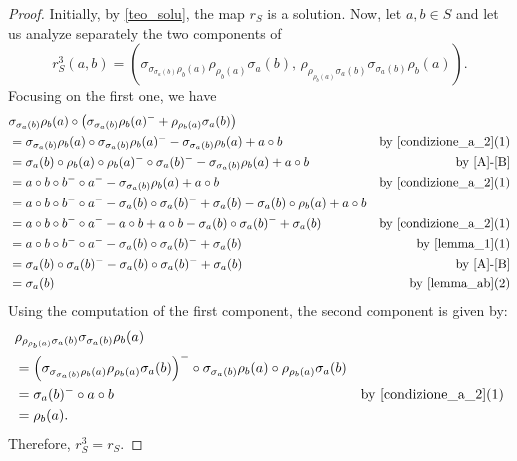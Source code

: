 \documentclass[preprint,1p]{elsarticle}
\theoremstyle{definition}               %
\begin{document}
\begin{proof}
Initially, by \cref{teo_solu}, the map $r_S$ is a solution.  Now, let $a,b \in S$ and 
    let us analyze separately the two components of $$r_S^3(a,b)=\left(\sigma_{\sigma_{\sigma_a(b)}\rho_b(a)}\rho_{\rho_b(a)}\sigma_a(b), \, \rho_{\rho_{\rho_b(a)}\sigma_a(b)}\sigma_{\sigma_a(b)}\rho_b(a)\right).$$
    Focusing on the first one, we have
    \begin{align*}
    &\sigma_{\sigma_a(b)}\rho_b(a)\circ\left( \sigma_{\sigma_a(b)}\rho_b(a)^-+ \rho_{\rho_b(a)}\sigma_a(b)\right)\\
    &=\sigma_{\sigma_a(b)}\rho_b(a)\circ \sigma_{\sigma_a(b)}\rho_b(a)^--\sigma_{\sigma_a(b)}\rho_b(a) + a \circ b &\mbox{by \cref{condizione_a_2}(1)}\\
    & =\sigma_a(b)\circ\rho_b(a)\circ\rho_b(a)^-\circ\sigma_a(b)^- -\sigma_{\sigma_a(b)}\rho_b(a) + a \circ b &\mbox{by \eqref{A}-\eqref{B}}\\
    &=a \circ b \circ b^- \circ a^- -\sigma_{\sigma_a(b)}\rho_b(a) + a \circ b &\mbox{by \cref{condizione_a_2}(1)}\\
        &={a \circ b \circ b^- \circ a^- -\sigma_a(b) \circ \sigma_a(b)^- + \sigma_a(b) -\sigma_a(b) \circ \rho_b(a) + a \circ b}\\
        &={a \circ b \circ b^- \circ a^- -a \circ b + a \circ b -\sigma_a(b) \circ \sigma_a(b)^- + \sigma_a(b)} &\mbox{by \cref{condizione_a_2}(1)}\\
         &={a \circ b \circ b^- \circ a^- -\sigma_a(b) \circ \sigma_a(b)^- + \sigma_a(b)} &\mbox{{by \cref{lemma_1}(1)}}\\
         &={\sigma_a(b) \circ \sigma_a(b)^--\sigma_a(b) \circ \sigma_a(b)^-+ \sigma_a(b)} &\mbox{by \eqref{A}-\eqref{B}}\\
         &=\sigma_a(b) &\mbox{by \cref{lemma_ab}(2)}
    \end{align*}
Using the computation of the first component, the second component is given by:
        \begin{align*}
         &\rho_{\rho_{\rho_b(a)}\sigma_a(b)}\sigma_{\sigma_a(b)}\rho_b(a)\\
        &=\left(\sigma_{\sigma_{\sigma_a(b)}\rho_b(a)}\rho_{\rho_b(a)}\sigma_a(b)\right)^- \circ \sigma_{\sigma_a(b)}\rho_b(a) \circ \rho_{\rho_b(a)}\sigma_a(b)
        \\
        &=\sigma_a(b)^- \circ a \circ b &\mbox{by \cref{condizione_a_2}(1)}\\
    &=\rho_b(a).
    \end{align*} 
    Therefore, $r_S^3=r_S.$


\end{proof}
\end{document}
